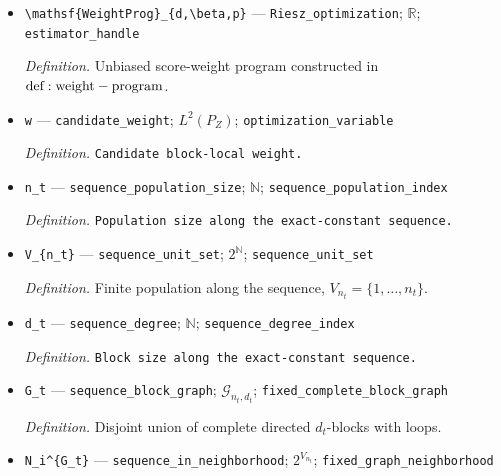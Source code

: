 \documentclass{article}
\begin{document}
\begin{itemize}
  \par\smallskip\noindent\emph{Definition.} Normalized perturbation program constructed in \({\rm def:perturbation-program}\).
  \item \texttt{\textbackslash{}\allowbreak{}mathsf\{WeightProg\}\allowbreak{}\_\allowbreak{}\{d,\allowbreak{}\textbackslash{}\allowbreak{}beta,\allowbreak{}p\}\allowbreak{}} --- \texttt{Riesz\_\allowbreak{}optimization}; \(\mathbb R\); \texttt{estimator\_\allowbreak{}handle}
  \par\smallskip\noindent\emph{Definition.} Unbiased score-weight program constructed in \({\rm def:weight-program}\).
  \item \texttt{w} --- \texttt{candidate\_\allowbreak{}weight}; \(L^2(P_Z)\); \texttt{optimization\_\allowbreak{}variable}
  \par\smallskip\noindent\emph{Definition.} \texttt{Candidate block-\allowbreak{}local weight.}
  \item \texttt{n\_\allowbreak{}t} --- \texttt{sequence\_\allowbreak{}population\_\allowbreak{}size}; \(\mathbb N\); \texttt{sequence\_\allowbreak{}population\_\allowbreak{}index}
  \par\smallskip\noindent\emph{Definition.} \texttt{Population size along the exact-\allowbreak{}constant sequence.}
  \item \texttt{V\_\allowbreak{}\{n\_\allowbreak{}t\}\allowbreak{}} --- \texttt{sequence\_\allowbreak{}unit\_\allowbreak{}set}; \(2^{\mathbb N}\); \texttt{sequence\_\allowbreak{}unit\_\allowbreak{}set}
  \par\smallskip\noindent\emph{Definition.} Finite population along the sequence, \(V_{n_t}=\{1,\ldots,n_t\}\).
  \item \texttt{d\_\allowbreak{}t} --- \texttt{sequence\_\allowbreak{}degree}; \(\mathbb N\); \texttt{sequence\_\allowbreak{}degree\_\allowbreak{}index}
  \par\smallskip\noindent\emph{Definition.} \texttt{Block size along the exact-\allowbreak{}constant sequence.}
  \item \texttt{G\_\allowbreak{}t} --- \texttt{sequence\_\allowbreak{}block\_\allowbreak{}graph}; \(\mathcal G_{n_t,d_t}\); \texttt{fixed\_\allowbreak{}complete\_\allowbreak{}block\_\allowbreak{}graph}
  \par\smallskip\noindent\emph{Definition.} Disjoint union of complete directed \(d_t\)-blocks with loops.
  \item \texttt{N\_\allowbreak{}i\textasciicircum{}\{G\_\allowbreak{}t\}\allowbreak{}} --- \texttt{sequence\_\allowbreak{}in\_\allowbreak{}neighborhood}; \(2^{V_{n_t}}\); \texttt{fixed\_\allowbreak{}graph\_\allowbreak{}neighborhood}

\end{itemize}
\end{document}
